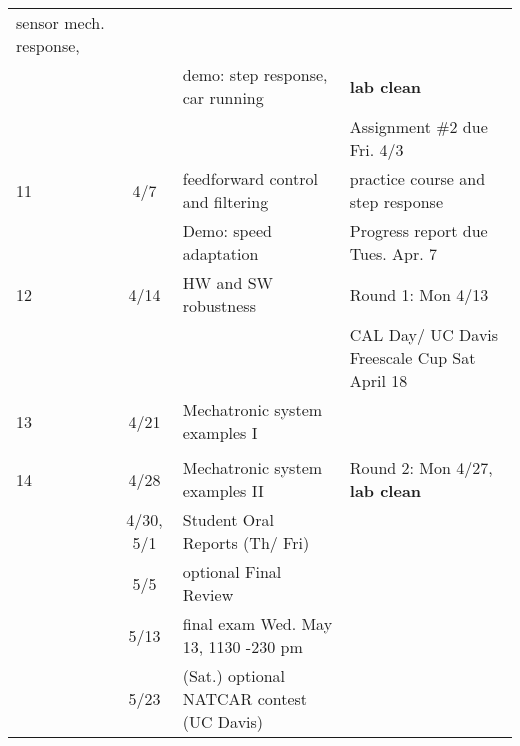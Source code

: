 \documentclass[10pt]{article}
\begin{document}
\begin{tabular}{l| c|l|l}
sensor mech. response,\\
& & demo: step response, car running &  {\bf lab clean}  \\
&  &                     & Assignment \#2 due Fri. 4/3\\
\hline
11 & 4/7 & feedforward control and filtering & practice course and step response\\
 &  & Demo: speed adaptation & Progress report due Tues. Apr. 7\\
\hline
12 &4/14 & HW and SW robustness & Round 1: Mon 4/13\\
 & &                        & CAL Day/ UC Davis Freescale Cup Sat April 18 \\
\hline
13 & 4/21 & Mechatronic system examples I &\\
& &   \\ 
\hline
14 & 4/28 & Mechatronic system examples II &  Round 2: Mon 4/27, {\bf lab clean}\\
\hline
& 4/30, 5/1  & Student Oral Reports (Th/ Fri)\\
\hline
& 5/5 & optional Final Review\\
\hline
 & 5/13 & final exam Wed. May 13, 1130 -230 pm &\\
\hline
& 5/23 & (Sat.) optional NATCAR contest (UC Davis) & \\
\hline
\end{tabular}
\par
\end{document}
